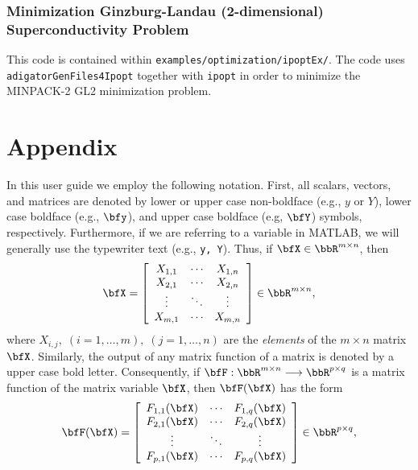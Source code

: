\documentclass[10pt,pdftex]{article}
\begin{document}
\subsubsection{Minimization Ginzburg-Landau (2-dimensional) Superconductivity Problem}
This code is contained within \texttt{examples/optimization/ipoptEx/}. The code uses \texttt{adigatorGenFiles4Ipopt} together with \texttt{ipopt} in order to minimize the MINPACK-2 GL2 minimization problem.

\section*{Appendix}\hypertarget{Appendix}{}

In this user guide we employ the following notation.  First, all scalars, vectors, and matrices are denoted by lower or upper case non-boldface (e.g., $y$ or $Y$), lower case boldface (e.g., $\bfy$), and upper case boldface (e.g, $\bfY$) symbols, respectively. Furthermore, if we are referring to a variable in MATLAB, we will generally use the typewriter text (e.g., \texttt{y, Y}).
Thus, if $\bfX\in\bbR^{m\times n}$, then
\begin{equation}\label{general-matrix-x}
  \bfX =
  \left[\begin{array}{ccc}
      X_{1,1} & \cdots & X_{1,n} \\
      X_{2,1} & \cdots & X_{2,n} \\
      \vdots & \ddots & \vdots \\
      X_{m,1} & \cdots & X_{m,n}
    \end{array}
  \right]\in\bbR^{m\times n}, 
\end{equation}
where $X_{i,j},\;(i=1,\ldots,m),\;(j=1,\ldots,n)$ are the {\em elements} 
of the $m\times n$ matrix $\bfX$.  Similarly, the output of any
matrix function of a matrix is denoted by a upper case bold letter.  Consequently,
if $\bfF:\bbR^{m\times n}\longrightarrow \bbR^{p\times q}$ is a matrix
function of the matrix variable $\bfX$, then $\bfF(\bfX)$ has the form
\begin{equation}\label{general-matrix-f}
  \bfF(\bfX) =
  \left[
    \begin{array}{ccc}
      F_{1,1}(\bfX) & \cdots & F_{1,q}(\bfX) \\
      F_{2,1}(\bfX) & \cdots & F_{2,q}(\bfX) \\
      \vdots & \ddots & \vdots \\
      F_{p,1}(\bfX) & \cdots & F_{p,q}(\bfX)
    \end{array}
  \right]\in\bbR^{p\times q},
\end{equation}
\end{document}
